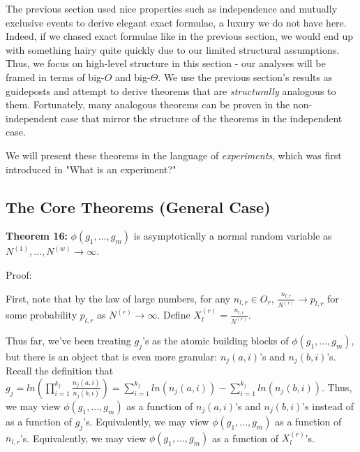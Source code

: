 \documentclass{article}
\begin{document}
The previous section used nice properties such as independence and mutually exclusive events to derive elegant exact formulae, a luxury we do not have here. Indeed, if we chased exact formulae like in the previous section, we would end up with something hairy quite quickly due to our limited structural assumptions. Thus, we focus on high-level structure in this section - our analyses will be framed in terms of big-$O$ and big-$\Theta$. We use the previous section's results as guideposts and attempt to derive theorems that are \textit{structurally} analogous to them. Fortunately, many analogous theorems can be proven in the non-independent case that mirror the structure of the theorems in the independent case.

We will present these theorems in the language of \textit{experiments}, which was first introduced in "What is an experiment?"


\subsection{The Core Theorems (General Case)}



\textbf{Theorem 16: }$\displaystyle \phi \left( g_{1} ,...,g_{m}\right)$ is asymptotically a normal random variable as $\displaystyle N^{\left( 1\right)} ,...,N^{\left( w\right)}\rightarrow \infty $.



Proof:

First, note that by the law of large numbers, for any $\displaystyle n_{l,r} \in O_{r}$, $\displaystyle \frac{n_{l,r}}{N^{\left( r\right)}}\rightarrow p_{l,r}$ for some probability $\displaystyle p_{l,r}$ as $\displaystyle N^{\left( r\right)}\rightarrow \infty $. Define $\displaystyle X_{l}^{\left( r\right)} =\frac{n_{l,r}}{N^{\left( r\right)}}$.



Thus far, we've been treating $\displaystyle g_{j}$'s as the atomic building blocks of $\displaystyle \phi \left( g_{1} ,...,g_{m}\right)$, but there is an object that is even more granular: $\displaystyle n_{j}\left( a,i\right)$'s and $\displaystyle n_{j}\left( b,i\right)$'s. Recall the definition that $\displaystyle g_{j} =ln\left(\prod _{i=1}^{k_{j}}\frac{n_{j}\left( a,i\right)}{n_{j}\left( b,i\right)}\right) =\sum _{i=1}^{k_{j}} ln\left( n_{j}\left( a,i\right)\right) -\sum _{i=1}^{k_{j}} ln\left( n_{j}\left( b,i\right)\right)$. Thus, we may view $\displaystyle \phi \left( g_{1} ,...,g_{m}\right)$ as a function of $\displaystyle n_{j}\left( a,i\right)$'s and $\displaystyle n_{j}\left( b,i\right)$'s instead of as a function of $\displaystyle g_{j}$'s. Equivalently, we may view $\displaystyle \phi \left( g_{1} ,...,g_{m}\right)$ as a function of $\displaystyle n_{l,r}$'s. Equivalently, we may view $\displaystyle \phi \left( g_{1} ,...,g_{m}\right)$ as a function of $\displaystyle X_{l}^{\left( r\right)}$'s. 
\end{document}

